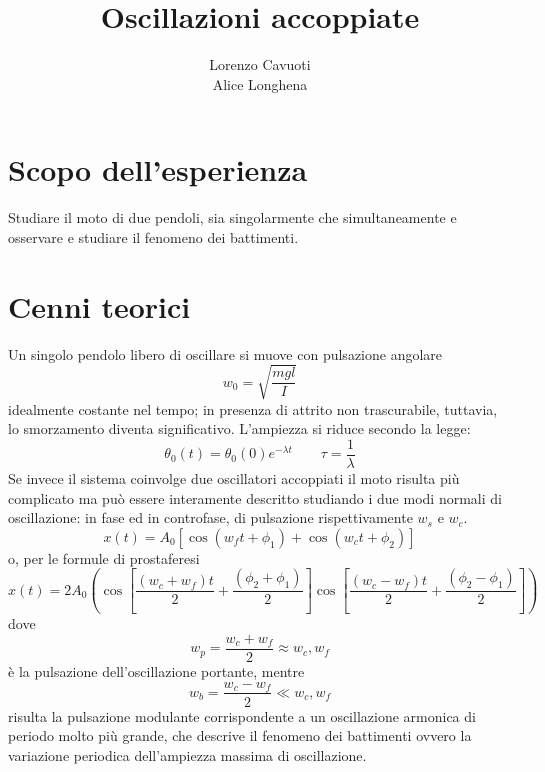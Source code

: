 \documentclass{article}
\title{Oscillazioni accoppiate}
\author{Lorenzo Cavuoti \\ Alice Longhena}
\begin{document}
		\maketitle
	
	\section{Scopo dell'esperienza}
		Studiare il moto di due pendoli, sia singolarmente che simultaneamente e osservare e studiare il fenomeno dei battimenti.
	
	\section{Cenni teorici}
		Un singolo pendolo libero di oscillare si muove con pulsazione angolare
		\begin{equation}
			\label{w0}
			w_0 = \sqrt{\frac{mgl}{I}}
		\end{equation}
		idealmente costante nel tempo; in presenza di attrito non trascurabile, tuttavia, lo smorzamento diventa significativo. L'ampiezza si riduce secondo la legge:
		\begin{equation}
			\label{ampiezza smorzata}
			\theta_0(t) = \theta_0(0)e^{-\lambda t} \qquad \tau = \frac{1}{\lambda}
		\end{equation}
		Se invece il sistema coinvolge due oscillatori accoppiati il moto risulta pi\`{u} complicato ma pu\`{o} essere interamente descritto studiando i due modi normali di oscillazione: in fase ed in controfase, di pulsazione rispettivamente $ w_s $ e $ w_c $.
		\begin{equation}
			\label{battimenti}
			x(t) = A_0[\cos(w_ft + \phi_1) + \cos(w_ct + \phi_2)]
		\end{equation}
		o, per le formule di prostaferesi
		\begin{equation}
			x(t) = 2A_0(\cos[\frac{(w_c + w_f)t}{2}+\frac{(\phi_2 + \phi_1)}{2}]\cos[\frac{(w_c - w_f)t}{2}+\frac{(\phi_2 - \phi_1)}{2}])
			\label{prostaferesi}
		\end{equation}
		dove 
		\begin{equation}
			\label{pulsazione portante}
			w_p = \frac{w_c + w_f}{2}\approx w_c, w_f
		\end{equation}
		\`{e} la pulsazione dell'oscillazione portante, mentre
		\begin{equation}
			\label{pulsazione modulante}
			w_b = \frac{w_c - w_f}{2}\ll w_c, w_f
		\end{equation}
		risulta la pulsazione modulante corrispondente a un oscillazione armonica di periodo molto pi\`{u} grande, che descrive il fenomeno dei battimenti ovvero la variazione periodica dell'ampiezza massima di oscillazione.
	
\end{document}
